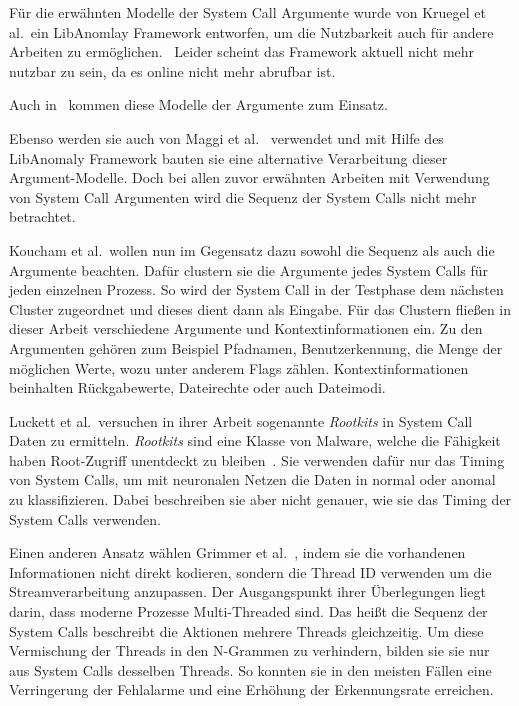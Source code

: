             Für die erwähnten Modelle der System Call Argumente wurde von Kruegel et al.\ ein LibAnomlay Framework entworfen, um die Nutzbarkeit auch für andere Arbeiten zu ermöglichen.~\cite{ARGUMENTS}
            Leider scheint das Framework aktuell nicht mehr nutzbar zu sein, da es online nicht mehr abrufbar ist.\par\medskip

            Auch in~\cite{ARGUMENTS2} kommen diese Modelle der Argumente zum Einsatz.
            
            Ebenso werden sie auch von Maggi et al.~\cite{MAGGI} verwendet und mit Hilfe des LibAnomaly Framework bauten sie eine alternative Verarbeitung dieser Argument-Modelle.
            Doch bei allen zuvor erwähnten Arbeiten mit Verwendung von System Call Argumenten wird die Sequenz der System Calls nicht mehr betrachtet.\par\medskip

            Koucham et al.\ wollen nun im Gegensatz dazu sowohl die Sequenz als auch die Argumente beachten.
            Dafür clustern sie die Argumente jedes System Calls für jeden einzelnen Prozess.
            So wird der System Call in der Testphase dem nächsten Cluster zugeordnet und dieses dient dann als Eingabe.
            Für das Clustern fließen in dieser Arbeit verschiedene Argumente und Kontextinformationen ein.
            Zu den Argumenten gehören zum Beispiel Pfadnamen, Benutzerkennung, die Menge der möglichen Werte, wozu unter anderem Flags zählen.
            Kontextinformationen beinhalten Rückgabewerte, Dateirechte oder auch Dateimodi.~\cite{ARGUMENTCLUSTERKOUCHAM2015}

            Luckett et al.\ versuchen in ihrer Arbeit sogenannte \textit{Rootkits} in System Call Daten zu ermitteln.
            \textit{Rootkits} sind eine Klasse von Malware, welche die Fähigkeit haben Root-Zugriff unentdeckt zu bleiben~\cite{OSSECBRAY2008}.
            Sie verwenden dafür nur das Timing von System Calls, um mit neuronalen Netzen die Daten in normal oder anomal zu klassifizieren.
            Dabei beschreiben sie aber nicht genauer, wie sie das Timing der System Calls verwenden.~\cite{TIMINGLUCKETT2016}\par\medskip

            Einen anderen Ansatz wählen Grimmer et al.~\cite{IDSTHREADGRIMMER2021}, indem sie die vorhandenen Informationen nicht direkt kodieren, sondern die Thread ID verwenden um die Streamverarbeitung anzupassen.
            Der Ausgangspunkt ihrer Überlegungen liegt darin, dass moderne Prozesse Multi-Threaded sind.
            Das heißt die Sequenz der System Calls beschreibt die Aktionen mehrere Threads gleichzeitig.
            Um diese Vermischung der Threads in den N-Grammen zu verhindern, bilden sie sie nur aus System Calls desselben Threads.
            So konnten sie in den meisten Fällen eine Verringerung der Fehlalarme und eine Erhöhung der Erkennungsrate erreichen.

